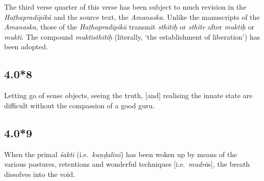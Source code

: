 \begin{ekdosis}
\begin{testimonia}[hp04_000_7]
\end{testimonia}

\begin{philcomm}[hp04_000_7]
The third verse quarter of this verse has been subject to much revision in the \emph{Haṭhapradīpikā} and the source text, the \emph{Amanaska}. Unlike the manuscripts of the \emph{Amanaska}, those of the \emph{Haṭhapradīpikā} transmit \emph{sthitiḥ} or \emph{sthite} after \emph{muktiḥ} or \emph{mukti}. The compound \emph{muktisthitiḥ} (literally, `the establishment of liberation') has been adopted. 
%
\end{philcomm}

\subsection*{4.0*8}
\begin{translation}[hp04_000_8]
Letting go of sense objects, seeing the truth, [and] realising the innate state are difficult without the compassion of a good guru.
\end{translation}




\subsection*{4.0*9}
\begin{translation}[hp04_000_9]
When the primal \emph{śakti} (i.e.~\emph{kuṇḍalinī}) has been woken up by means of the various postures, retentions and wonderful techniques [i.e.~\emph{mudrā}s], the breath dissolves into the void.
\end{translation}


\end{ekdosis}
